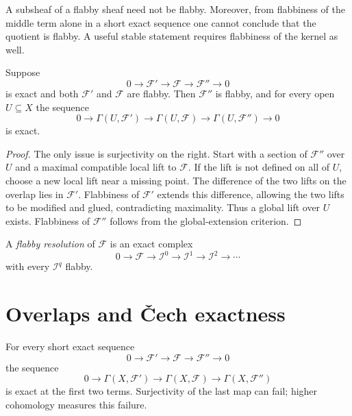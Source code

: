 \begin{warning}\label{warning:vi46-subquotient}
A subsheaf of a flabby sheaf need not be flabby. Moreover, from flabbiness of the middle term alone in a short exact sequence one cannot conclude that the quotient is flabby. A useful stable statement requires flabbiness of the kernel as well.
\end{warning}


\begin{theorem}\label{thm:vi46-short-exact}
Suppose
\[
0\longrightarrow\mathcal F'\longrightarrow\mathcal F\longrightarrow\mathcal F''\longrightarrow0
\]
is exact and both $\mathcal F'$ and $\mathcal F$ are flabby. Then $\mathcal F''$ is flabby, and for every open $U\subseteq X$ the sequence
\[
0\to\Gamma(U,\mathcal F')\to\Gamma(U,\mathcal F)\to\Gamma(U,\mathcal F'')\to0
\]
is exact.
\begin{proof}
The only issue is surjectivity on the right. Start with a section of $\mathcal F''$ over $U$ and a maximal compatible local lift to $\mathcal F$. If the lift is not defined on all of $U$, choose a new local lift near a missing point. The difference of the two lifts on the overlap lies in $\mathcal F'$. Flabbiness of $\mathcal F'$ extends this difference, allowing the two lifts to be modified and glued, contradicting maximality. Thus a global lift over $U$ exists. Flabbiness of $\mathcal F''$ follows from the global-extension criterion.
\end{proof}
\end{theorem}

\begin{definition}\label{def:vi46-flabby-resolution}
A \emph{flabby resolution} of $\mathcal F$ is an exact complex
\[
0\to\mathcal F\to\mathcal I^0\to\mathcal I^1\to\mathcal I^2\to\cdots
\]
with every $\mathcal I^q$ flabby.
\end{definition}

\section{Overlaps and \v{C}ech exactness}
\begin{proposition}\label{prop:vi46-left-exact}
For every short exact sequence
\[
0\to\mathcal F'\to\mathcal F\to\mathcal F''\to0
\]
the sequence
\[
0\to\Gamma(X,\mathcal F')\to\Gamma(X,\mathcal F)\to\Gamma(X,\mathcal F'')
\]
is exact at the first two terms. Surjectivity of the last map can fail; higher cohomology measures this failure.
\end{proposition}

